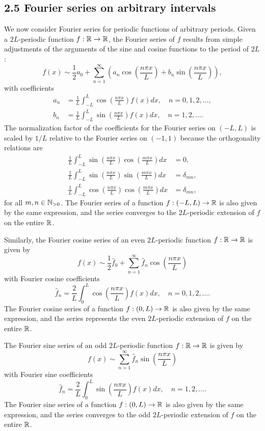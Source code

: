 \subsection{2.5 Fourier series on arbitrary intervals}
We now consider Fourier series for periodic functions of arbitrary periods. Given a $2L$-periodic function $f : \mathbb{R} \to \mathbb{R}$, the Fourier series of $f$ results from simple adjustments of the arguments of the sine and cosine functions to the period of $2L$:
\[f(x) \sim \frac{1}{2} a_0 + \sum_{n=1}^{\infty} \left(a_n \cos\left(\frac{n\pi x}{L}\right) + b_n \sin\left(\frac{n\pi x}{L}\right)\right),\]
with coefficients
\begin{align*}
    a_n &= \frac{1}{L} \int_{-L}^{L} \cos\left(\frac{n\pi x}{L}\right) f(x) dx, \quad n = 0, 1, 2, \dots, \\
    b_n &= \frac{1}{L} \int_{-L}^{L} \sin\left(\frac{n\pi x}{L}\right) f(x) dx, \quad n = 1, 2, \dots.
\end{align*}
The normalization factor of the coefficients for the Fourier series on $(-L, L)$ is scaled by $1/L$ relative to the Fourier series on $(-1, 1)$ because the orthogonality relations are
\begin{align*}
    \frac{1}{L} \int_{-L}^{L} \sin\left(\frac{n\pi x}{L}\right) \cos\left(\frac{m\pi x}{L}\right) dx &= 0, \\
    \frac{1}{L} \int_{-L}^{L} \sin\left(\frac{n\pi x}{L}\right) \sin\left(\frac{m\pi x}{L}\right) dx &= \delta_{mn}, \\
    \frac{1}{L} \int_{-L}^{L} \cos\left(\frac{n\pi x}{L}\right) \cos\left(\frac{m\pi x}{L}\right) dx &= \delta_{mn},
\end{align*}
for all $m, n \in \mathbb{N}_{>0}$. The Fourier series of a function $f : (-L, L) \to \mathbb{R}$ is also given by the same expression, and the series converges to the $2L$-periodic extension of $f$ on the entire $\mathbb{R}$.

Similarly, the Fourier cosine series of an even $2L$-periodic function $f : \mathbb{R} \to \mathbb{R}$ is given by
\[f(x) \sim \frac{1}{2} \hat{f}_0 + \sum_{n=1}^{\infty} \hat{f}_n \cos\left(\frac{n\pi x}{L}\right)\]
with Fourier cosine coefficients
\[\hat{f}_n = \frac{2}{L} \int_0^L \cos\left(\frac{n\pi x}{L}\right) f(x) dx, \quad n = 0, 1, 2, \dots.\]
The Fourier cosine series of a function $f : (0, L) \to \mathbb{R}$ is also given by the same expression, and the series represents the even $2L$-periodic extension of $f$ on the entire $\mathbb{R}$.

The Fourier sine series of an odd $2L$-periodic function $f : \mathbb{R} \to \mathbb{R}$ is given by
\[f(x) \sim \sum_{n=1}^{\infty} \hat{f}_n \sin\left(\frac{n\pi x}{L}\right)\]
with Fourier sine coefficients
\[\hat{f}_n = \frac{2}{L} \int_0^L \sin\left(\frac{n\pi x}{L}\right) f(x) dx, \quad n = 1, 2, \dots.\]
The Fourier sine series of a function $f : (0, L) \to \mathbb{R}$ is also given by the same expression, and the series converges to the odd $2L$-periodic extension of $f$ on the entire $\mathbb{R}$.

